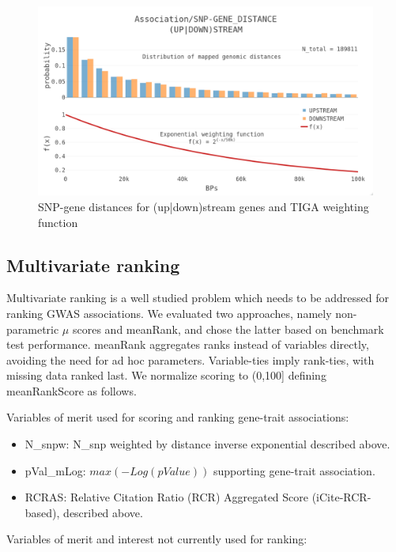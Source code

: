 \begin{figure}
	\includegraphics[width=\textwidth]{figures/tiga/SupFIG02_distance_weighting_function.jpg}
	\caption{SNP-gene distances for (up|down)stream genes and TIGA weighting function}
	\label{fig:TIGA_Sup02}
\end{figure}

\subsection{Multivariate ranking}

Multivariate ranking is a well studied problem which needs to be addressed for ranking GWAS associations. We evaluated two approaches, namely non-parametric $\mu$ scores\cite{Wittkowski2008-mz} and meanRank, and chose the latter based on benchmark test performance. meanRank aggregates ranks instead of variables directly, avoiding the need for ad hoc parameters. Variable-ties imply rank-ties, with missing data ranked last. We normalize scoring to (0,100] defining meanRankScore as follows.

Variables of merit used for scoring and ranking gene-trait associations:

\begin{itemize}
\item N\_snpw: N\_snp weighted by distance inverse exponential described above.
\item pVal\_mLog: $max(-Log(pValue))$ supporting gene-trait association.
\item RCRAS: Relative Citation Ratio (RCR) Aggregated Score (iCite-RCR-based), described above.
\end{itemize}

Variables of merit and interest not currently used for ranking:

